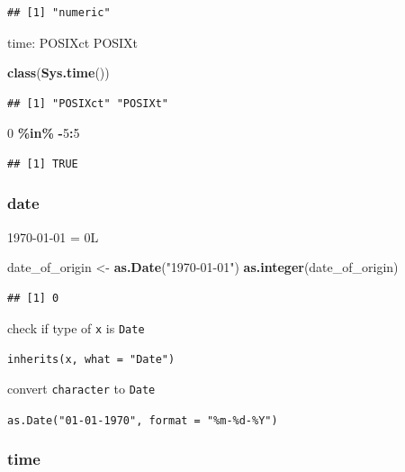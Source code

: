 \documentclass[
]{book}
\newenvironment{Shaded}{\begin{snugshade}}{\end{snugshade}}
\newcommand{\DecValTok}[1]{\textcolor[rgb]{0.00,0.00,0.81}{#1}}
\newcommand{\FunctionTok}[1]{\textcolor[rgb]{0.13,0.29,0.53}{\textbf{#1}}}
\newcommand{\NormalTok}[1]{#1}
\newcommand{\OtherTok}[1]{\textcolor[rgb]{0.56,0.35,0.01}{#1}}
\newcommand{\SpecialCharTok}[1]{\textcolor[rgb]{0.81,0.36,0.00}{\textbf{#1}}}
\newcommand{\StringTok}[1]{\textcolor[rgb]{0.31,0.60,0.02}{#1}}
\theoremstyle{definition}
\theoremstyle{definition}
\theoremstyle{definition}
\theoremstyle{definition}
\theoremstyle{remark}
\begin{document}
\begin{verbatim}
## [1] "numeric"
\end{verbatim}

time: POSIXct POSIXt

\begin{Shaded}
\begin{Highlighting}[]
\FunctionTok{class}\NormalTok{(}\FunctionTok{Sys.time}\NormalTok{())}
\end{Highlighting}
\end{Shaded}

\begin{verbatim}
## [1] "POSIXct" "POSIXt"
\end{verbatim}

\begin{Shaded}
\begin{Highlighting}[]
\DecValTok{0} \SpecialCharTok{\%in\%} \SpecialCharTok{{-}}\DecValTok{5}\SpecialCharTok{:}\DecValTok{5}
\end{Highlighting}
\end{Shaded}

\begin{verbatim}
## [1] TRUE
\end{verbatim}

\hypertarget{date}{%
\subsubsection{date}\label{date}}

1970-01-01 = 0L

\begin{Shaded}
\begin{Highlighting}[]
\NormalTok{date\_of\_origin }\OtherTok{\textless{}{-}} \FunctionTok{as.Date}\NormalTok{(}\StringTok{"1970{-}01{-}01"}\NormalTok{)}
\FunctionTok{as.integer}\NormalTok{(date\_of\_origin)}
\end{Highlighting}
\end{Shaded}

\begin{verbatim}
## [1] 0
\end{verbatim}

check if type of \texttt{x} is \texttt{Date}

\texttt{inherits(x,\ what\ =\ "Date")}

convert \texttt{character} to \texttt{Date}

\texttt{as.Date("01-01-1970",\ format\ =\ "\%m-\%d-\%Y")}

\hypertarget{time}{%
\subsubsection{time}\label{time}}
\end{document}
